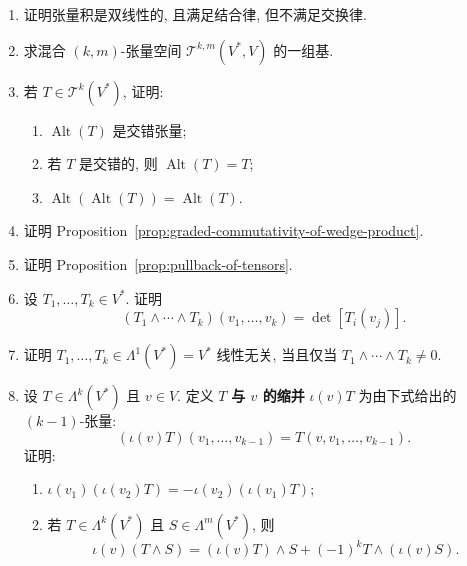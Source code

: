 \begin{RiemannExercise}\label{ex:tensors}
\begin{enumerate}[label=(\arabic*),ref=\arabic*,leftmargin=*]
\item\label{ex:tensor-product-properties} 证明张量积是双线性的, 且满足结合律, 但不满足交换律.
\item\label{ex:basis-of-mixed-tensors} 求混合 $(k,m)$-张量空间 $\mathcal{T}^{k,m}(V^*,V)$ 的一组基.
\item\label{ex:alternating-projection-properties} 若 $T\in\mathcal{T}^k(V^*)$, 证明:
\begin{enumerate}[label=(\alph*),leftmargin=*]
\item $\operatorname{Alt}(T)$ 是交错张量;
\item 若 $T$ 是交错的, 则 $\operatorname{Alt}(T)=T$;
\item $\operatorname{Alt}(\operatorname{Alt}(T))=\operatorname{Alt}(T)$.
\end{enumerate}
\item\label{ex:prove-graded-commutativity} 证明 Proposition~\ref{prop:graded-commutativity-of-wedge-product}.
\item\label{ex:prove-pullback-of-tensors-properties} 证明 Proposition~\ref{prop:pullback-of-tensors}.
\item\label{ex:wedge-of-linear-functionals-determinant} 设 $T_1,\ldots,T_k\in V^*$. 证明
\[
  (T_1\wedge\cdots\wedge T_k)(v_1,\ldots,v_k)=\det[T_i(v_j)].
\]
\item\label{ex:linear-independence-by-wedge-product} 证明 $T_1,\ldots,T_k\in\Lambda^1(V^*)=V^*$ 线性无关, 当且仅当 $T_1\wedge\cdots\wedge T_k\ne0$.
\item\label{ex:contraction-of-alternating-tensors} 设 $T\in\Lambda^k(V^*)$ 且 $v\in V$. 定义 $T$ \textbf{与 $v$ 的缩并} $\iota(v)T$ 为由下式给出的 $(k-1)$-张量:
\[
  (\iota(v)T)(v_1,\ldots,v_{k-1})=T(v,v_1,\ldots,v_{k-1}).
\]
证明:
\begin{enumerate}[label=(\alph*),leftmargin=*]
\item $\iota(v_1)(\iota(v_2)T)=-\iota(v_2)(\iota(v_1)T)$;
\item 若 $T\in\Lambda^k(V^*)$ 且 $S\in\Lambda^m(V^*)$, 则
\[
  \iota(v)(T\wedge S)=(\iota(v)T)\wedge S+(-1)^kT\wedge(\iota(v)S).
\]
\end{enumerate}
\end{enumerate}
\end{RiemannExercise}
